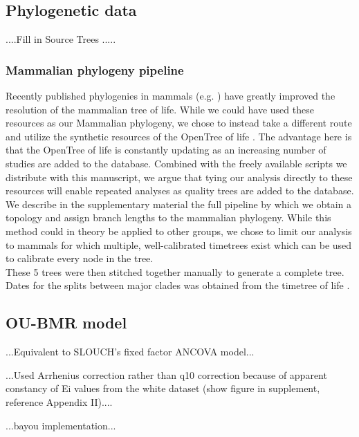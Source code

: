 \documentclass[a4paper,11pt]{article}
\begin{document}
\subsection*{Phylogenetic data}
....Fill in Source Trees .....

\subsubsection*{Mammalian phylogeny pipeline} Recently published phylogenies in mammals (e.g. \citet{Faurby2014}) have greatly improved the resolution of the mammalian tree of life. While we could have used these resources as our Mammalian phylogeny, we chose to instead take a different route and utilize the synthetic resources of the OpenTree of life \citep{Cranston, OpenTree}. The advantage here is that the OpenTree of life is constantly updating as an increasing number of studies are added to the database. Combined with the freely available scripts we distribute with this manuscript, we argue that tying our analysis directly to these resources will enable repeated analyses as quality trees are added to the database. We describe in the supplementary material the full pipeline by which we obtain a topology and assign branch lengths to the mammalian phylogeny. While this method could in theory be applied to other groups, we chose to limit our analysis to mammals for which multiple, well-calibrated timetrees exist which can be used to calibrate every node in the tree. \\

These 5 trees were then stitched together manually to generate a complete tree. Dates for the splits between major clades was obtained from the timetree of life \citep{Hedges}.

\subsection*{OU-BMR model} 

...Equivalent to SLOUCH's fixed factor ANCOVA model...

...Used Arrhenius correction rather than q10 correction because of apparent constancy of Ei values from the white dataset (show figure in supplement, reference Appendix II)....

...bayou implementation...
\end{document}
